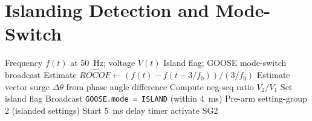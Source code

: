 \section{Islanding Detection and Mode-Switch}
\label{app:alg_island}

\begin{algorithm}[htbp]
\caption{ROCOF Islanding Detection and GFM Mode-Switch (Ch.~\ref{ch:microgrid})}
\label{alg:app_island}
\begin{algorithmic}[1]
\Require Frequency $f(t)$ at 50~Hz; voltage $V(t)$
\Ensure Island flag; GOOSE mode-switch broadcast
\State Estimate $\widehat{ROCOF} \leftarrow (f(t) - f(t - 3/f_0)) / (3/f_0)$
\State Estimate vector surge $\Delta\theta$ from phase angle difference
\State Compute neg-seq ratio $V_2/V_1$
  \State Set island flag
  \State Broadcast \texttt{GOOSE.mode = ISLAND} (within 4~ms)
  \State Pre-arm setting-group 2 (islanded settings)
  \State Start 5~ms delay timer
   activate SG2
  \EndIf
\EndIf
\end{algorithmic}
\end{algorithm}
